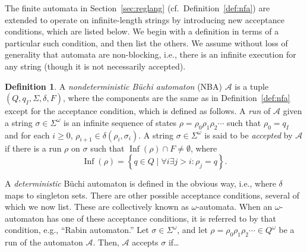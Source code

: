 \documentclass{amsart}
\DeclareMathOperator{\Inf}{Inf}
\theoremstyle{plain}
\theoremstyle{definition}
\newtheorem{defn}{Definition}
\theoremstyle{definition}
\begin{document}
The finite automata in Section~\ref{sec:reglang} (cf.\ Definition~\ref{def:nfa})
are extended to operate on infinite-length strings by introducing new acceptance
conditions, which are listed below.  We begin with a definition in terms of a
particular such condition, and then list the others.  We assume without loss of
generality that automata are non-blocking, i.e., there is an infinite execution
for any string (though it is not necessarily accepted).
\begin{defn}
A \textit{nondeterministic B\"uchi automaton} (NBA) $\mathcal{A}$ is a tuple $( Q,
q_I, \Sigma, \delta, F )$, where the components are the same as in
Definition~\ref{def:nfa} except for the acceptance condition, which is
defined as follows.  A \textit{run} of $\mathcal{A}$ given a string
$\sigma\in\Sigma^{\omega}$ is an infinite sequence of states $\rho = \rho_0 \rho_1 \rho_2
\cdots$ such that $\rho_0 = q_I$ and for each $i\geq0$, $\rho_{i+1}\in \delta(\rho_i , \sigma_{i})$.  A string $\sigma\in\Sigma^{\omega}$ is said to be
\textit{accepted} by $\mathcal{A}$ if there is a run $\rho$ on $\sigma$ such
that $\Inf(\rho)\cap F\neq \emptyset$, where
\begin{equation}
\Inf(\rho) = \left\{ q\in Q \mid \forall i \exists j>i : \rho_j = q \right\} .
\end{equation}
\end{defn}
A \textit{deterministic} B\"uchi automaton is defined in the obvious way, i.e.,
where $\delta$ maps to singleton sets.  There are other possible acceptance
conditions, several of which we now list.  These are collectively known as
$\omega$-automata.  When an $\omega$-automaton has one of these acceptance
conditions, it is referred to by that condition, e.g., ``Rabin automaton.''
Let $\sigma\in \Sigma^{\omega}$, and let $\rho = \rho_0 \rho_1 \rho_2 \cdots \in
Q^{\omega}$ be a run of the automaton $\mathcal{A}$. Then, $\mathcal{A}$ accepts
$\sigma$ if\ldots
\end{document}
